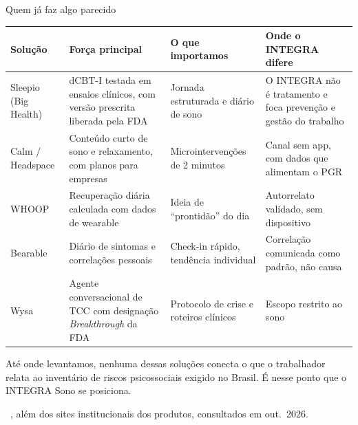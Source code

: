 \documentclass[aspectratio=169,10pt]{beamer}
\newcommand{\fonte}[1]{\par\vfill{\tiny\color{mudo}\faBookOpen\ #1\par}}
\renewcommand{\arraystretch}{1.25}
\begin{document}
\begin{frame}{Quem já faz algo parecido}
\scriptsize\renewcommand{\arraystretch}{1.12}
\begin{tabularx}{\textwidth}{@{}l L L L@{}}
\toprule
\textbf{Solução} & \textbf{Força principal} & \textbf{O que importamos} & \textbf{Onde o INTEGRA difere} \\
\midrule
Sleepio (Big Health) & dCBT-I testada em ensaios clínicos, com versão prescrita liberada pela FDA & Jornada estruturada e diário de sono & O INTEGRA não é tratamento e foca prevenção e gestão do trabalho \\
Calm / Headspace & Conteúdo curto de sono e relaxamento, com planos para empresas & Microintervenções de 2 minutos & Canal sem app, com dados que alimentam o PGR \\
WHOOP & Recuperação diária calculada com dados de wearable & Ideia de \enquote{prontidão} do dia & Autorrelato validado, sem dispositivo \\
Bearable & Diário de sintomas e correlações pessoais & Check-in rápido, tendência individual & Correlação comunicada como padrão, não causa \\
Wysa & Agente conversacional de TCC com designação \textit{Breakthrough} da FDA & Protocolo de crise e roteiros clínicos & Escopo restrito ao sono \\
\bottomrule
\end{tabularx}
\smallskip

\footnotesize Até onde levantamos, nenhuma dessas soluções conecta o que o
trabalhador relata ao inventário de riscos psicossociais exigido no
Brasil. É nesse ponto que o INTEGRA Sono se posiciona.
\fonte{\textcite{fda_k233577,aasm_sleepiorx_2024,wysa_fda_2022}, além dos sites
  institucionais dos produtos, consultados em out.\ 2026.}
\end{frame}
\end{document}
